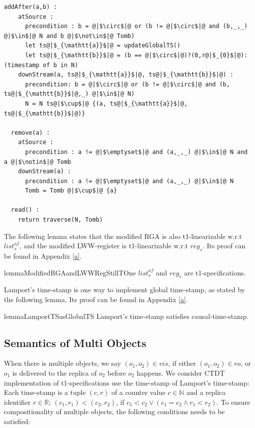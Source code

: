 {\begin{lstlisting}[caption={Pseudo-code of the Modified RGA}, captionpos=b,label={lst:modifier rga}]
  addAfter(a,b) :
    atSource :
      precondition : b = @|$\circ$|@ or (b != @|$\circ$|@ and (b,_,_) @|$\in$|@ N and b @|$\not\in$|@ Tomb)
      let ts@|$_{\mathtt{a}}$|@ = updateGlobalTS()
      let ts@|$_{\mathtt{b}}$|@ = (b == @|$\circ$|@)?(0,r@|$_{0}$|@):(timestamp of b in N)
    downStream(a, ts@|$_{\mathtt{a}}$|@, ts@|$_{\mathtt{b}}$|@) :
      precondition: b = @|$\circ$|@ or (b != @|$\circ$|@ and (b, ts@|$_{\mathtt{b}}$|@,_) @|$\in$|@ N)
      N = N ts@|$\cup$|@ {(a, ts@|$_{\mathtt{a}}$|@, ts@|$_{\mathtt{b}}$|@)}

  remove(a) :
    atSource :
      precondition : a != @|$\emptyset$|@ and (a,_,_) @|$\in$|@ N and a @|$\notin$|@ Tomb
    downStream(a) :
      precondition : a != @|$\emptyset$|@ and (a,_,_) @|$\in$|@ N
      Tomb = Tomb @|$\cup$|@ {a}

  read() :
    return traverse(N, Tomb)
\end{lstlisting}


The following lemma states that the modified RGA is also t1-linearizable w.r.t $\mathit{list}_s^{\mathit{af}}$, and the modified LWW-register is t1-linearizable w.r.t $\mathit{reg}_s$. Its proof can be found in Appendix \ref{a}.

\begin{restatable}{lemma}{ModifiedRGAandLWWRegStillTOne}
\label{lemma:modified RGA and LWW-register is still t1-linearizable}
$\mathit{list}_s^{\mathit{af}}$ and $\mathit{reg}_s$ are t1-specifications.
\end{restatable}

Lamport's time-stamp is one way to implement global time-stamp, as stated by the following lemma. Its proof can be found in Appendix \ref{a}.

\begin{restatable}{lemma}{LamportTSasGlobalTS}
\label{lemma:lamport time-stamp as global time-stamp}
Lamport's time-stamp satisfies causal-time-stamp.
\end{restatable}








\subsection{Semantics of Multi Objects}
\label{subsec:semantics of multi objects}

When there is multiple objects, we say $(o_1,o_2) \in \mathit{vis}$, if either $(o_1,o_2) \in \mathit{ro}$, or $o_1$ is delivered to the replica of $o_2$ before $o_2$ happens. We consider CTDT implementation of t1-specifications use the time-stamp of Lamport's time-stamp: Each time-stamp is a tuple $(c,r)$ of a counter value $c \in \mathbb{N}$ and a replica identifier $r \in \mathbb{R}$; $(c_1,r_1) < (c_2,r_2)$, if $c_1 < c_2 \vee (c_1 = c_2 \wedge r_1 < r_2)$. To ensure compositionality of multiple objects, the following conditions needs to be satisfied:

}
